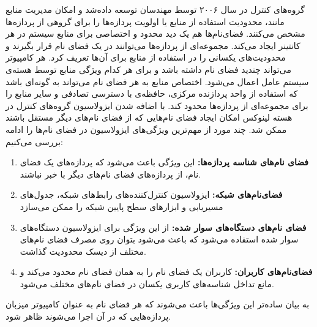     گروه‌های کنترل در سال ۲۰۰۶ توسط مهندسان  توسعه داده‌شد و امکان مدیریت منابع مانند، محدودیت استفاده از منابع یا اولویت پردازه‌ها را برای گروهی از پردازه‌ها مشخص می‌کنند.
    فضای‌نام‌ها هم یک دید محدود و اختصاصی برای منابع سیستم در هر کانتینر ایجاد می‌کند.
    مجموعه‌ای از پردازه‌ها می‌توانند در یک فضای نام قرار بگیرند و محدودیت‌های یکسانی را در استفاده از منابع برای آن‌ها تعریف کرد.
    هر کامپیوتر می‌تواند چندید فضای نام داشته باشد و برای هر کدام ویژگی منابع توسط هسته‌ی سیستم عامل اعمال می‌شود.
    اختصاص منابع به هر فضای نام می‌تواند به گونه‌ای باشد که استفاده از واحد پردازنده مرکزی، حافظه‌ی با دسترسی تصادفی و سایر منابع را برای مجموعه‌ای از پردازه‌ها محدود کند.
    با اضافه شدن ایزولاسیون گروه‌های کنترل در هسته لینوکس امکان ایجاد فضای نام‌هایی که از فضای نام‌های دیگر مستقل باشند ممکن شد.
    چند مورد از مهم‌ترین ویژگی‌های ایزولاسیون در فضای نام‌ها را ادامه بررسی می‌کنیم:
    \begin{enumerate}
      \item \textbf{فضای نام‌های شناسه پردازه‌ها:} این ویژگی باعث می‌شود که پردازه‌های یک فضای نام، از پردازه‌های فضای نام‌های دیگر با خبر نباشند.
      \item \textbf{فضای‌نام‌های شبکه:} ایزولاسیون کنترل‌کننده‌های رابط‌های‌ شبکه، جدول‌های مسیریابی و ابزار‌های سطح پایین شبکه را ممکن می‌سازد
      \item \textbf{فضای نام‌های دستگاه‌های سوار شده:} از این ویژگی برای ایزولاسیون دستگاه‌های سوار شده استفاده می‌شود که باعث می‌شود بتوان روی مصرف فضای نام‌های مختلف از دیسک محدودیت گذاشت.
      \item \textbf{فضای‌نام‌های کاربران:} کاربران یک فضای نام را به همان فضای نام محدود می‌کند و مانع تداخل شناسه‌های کاربری یکسان در فضای نام‌های مختلف می‌شود.
    \end{enumerate}
    به بیان ساده‌تر این ویژگی‌ها باعث می‌شوند که هر فضای نام به عنوان کامپیوتر میزبان پردازه‌هایی که در آن اجرا می‌شوند ظاهر شود.

